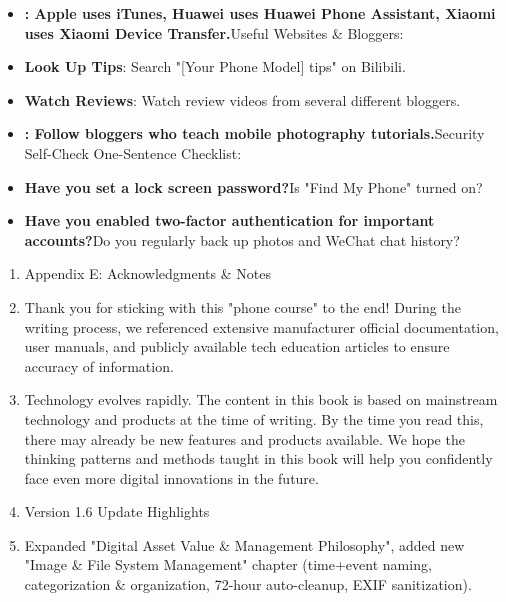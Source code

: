 

\begin{itemize}
  \item \textbf{: Apple uses iTunes, Huawei uses Huawei Phone Assistant, Xiaomi uses Xiaomi Device Transfer.}Useful Websites \& Bloggers:
  \item \textbf{Look Up Tips}: Search "[Your Phone Model] tips" on Bilibili.
  \item \textbf{Watch Reviews}: Watch review videos from several different bloggers.
\end{itemize}


\begin{itemize}
  \item \textbf{: Follow bloggers who teach mobile photography tutorials.}Security Self-Check One-Sentence Checklist:
  \item \textbf{Have you set a lock screen password?}Is "Find My Phone" turned on?
  \item \textbf{Have you enabled two-factor authentication for important accounts?}Do you regularly back up photos and WeChat chat history?
\end{itemize}


\begin{enumerate}
  \item Appendix E: Acknowledgments \& Notes
  \item Thank you for sticking with this "phone course" to the end! During the writing process, we referenced extensive manufacturer official documentation, user manuals, and publicly available tech education articles to ensure accuracy of information.
  \item Technology evolves rapidly. The content in this book is based on mainstream technology and products at the time of writing. By the time you read this, there may already be new features and products available. We hope the thinking patterns and methods taught in this book will help you confidently face even more digital innovations in the future.
  \item Version 1.6 Update Highlights
  \item Expanded "Digital Asset Value \& Management Philosophy", added new "Image \& File System Management" chapter (time+event naming, categorization \& organization, 72-hour auto-cleanup, EXIF sanitization).
\end{enumerate}
